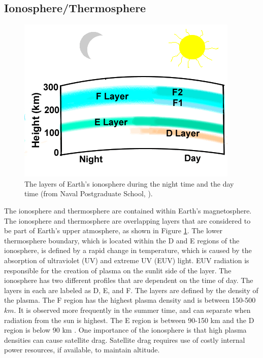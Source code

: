 \subsection{Ionosphere/Thermosphere}
\begin{figure}
    \centering
    \includegraphics[scale=0.75]{images/ionosphere.png}
    \caption{The layers of Earth's ionosphere during the night time and the day
    time (from Naval Postgraduate School, \citeyear{Ionosphere}).}
    \label{fig:IonoThermo}
    \figSpace
\end{figure}
The ionosphere and thermosphere are contained within Earth's magnetosphere.
The ionosphere and thermosphere are overlapping layers that are considered
to be part of Earth's upper atmosphere, as shown in Figure \ref{fig:IonoThermo}.
The lower thermosphere boundary, which is located within the D and E regions of
the ionosphere, is defined by a rapid change in temperature, which is caused by
the absorption of ultraviolet (UV) and extreme UV (EUV) light. EUV radiation is
responsible for the creation of plasma on the sunlit side of the layer. The ionosphere has two different
profiles that are dependent on the time of day. The layers in each are labeled
as D, E, and F. The layers are defined by the density of the plasma. The F
region has the highest plasma density and is between 150-500 $km$. It is observed
more frequently in the summer time, and can separate when radiation from the
sun is highest. The E region is between 90-150 km
and the D region is below 90 km \citep{Kelley}. One importance of the ionosphere
is that high plasma densities can cause satellite drag.  Satellite drag
requires use of costly internal power resources, if available, to maintain altitude.

